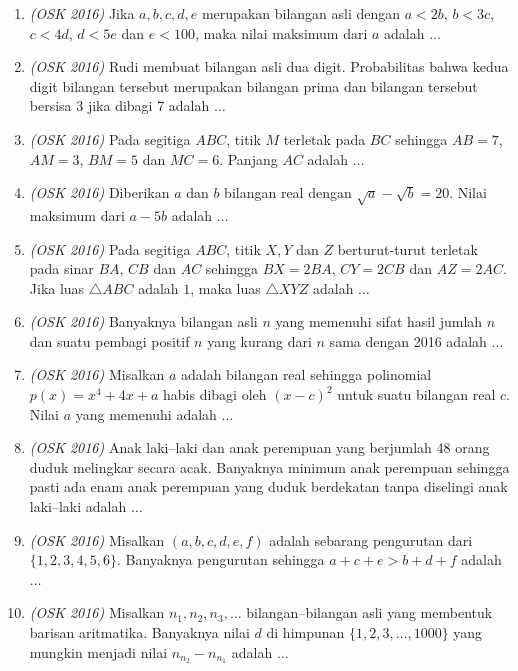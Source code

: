 \begin{enumerate}
	\item \textit{(OSK 2016)} Jika $a,b,c,d,e$ merupakan bilangan asli dengan $a < 2b$, $b < 3c$, $c < 4d$, $d < 5e$ dan $e < 100$, maka nilai maksimum dari $a$ adalah $\dots$
	
	\item \textit{(OSK 2016)} Rudi membuat bilangan asli dua digit. Probabilitas bahwa kedua digit bilangan tersebut merupakan bilangan prima dan bilangan tersebut bersisa 3 jika dibagi 7 adalah $\dots$
	
	\item \textit{(OSK 2016)} Pada segitiga $ABC$, titik $M$ terletak pada $BC$ sehingga $AB = 7$, $AM = 3$, $BM = 5$ dan $MC = 6$. Panjang $AC$ adalah $\dots$
	
	\item \textit{(OSK 2016)} Diberikan $a$ dan $b$ bilangan real dengan $\sqrt{a} - \sqrt{b} = 20$. Nilai maksimum dari $a - 5b$ adalah $\dots$
	
	\item \textit{(OSK 2016)} Pada segitiga $ABC$, titik $X,Y$ dan $Z$ berturut-turut terletak pada sinar $BA$, $CB$ dan $AC$ sehingga $BX = 2BA$, $CY = 2CB$ dan $AZ = 2AC$. Jika luas $\triangle ABC$ adalah $1$, maka luas $\triangle XYZ$ adalah $\dots$
	
	\item \textit{(OSK 2016)} Banyaknya bilangan asli $n$ yang memenuhi sifat hasil jumlah $n$ dan suatu pembagi positif $n$ yang kurang dari $n$ sama dengan 2016 adalah $\dots$
	
	\item \textit{(OSK 2016)} Misalkan $a$ adalah bilangan real sehingga polinomial $p(x) = x^4 + 4x + a$ habis dibagi oleh $(x - c)^2$ untuk suatu bilangan real $c$. Nilai $a$ yang memenuhi adalah $\dots$
	
	\item \textit{(OSK 2016)} Anak laki–laki dan anak perempuan yang berjumlah 48 orang duduk melingkar secara acak. Banyaknya minimum anak perempuan sehingga pasti ada enam anak perempuan yang duduk berdekatan tanpa diselingi anak laki–laki adalah $\dots$
	
	\item \textit{(OSK 2016)} Misalkan $(a,b,c,d,e,f)$ adalah sebarang pengurutan dari $\{1,2,3,4,5,6\}$. Banyaknya pengurutan sehingga $a + c + e > b + d + f$ adalah $\dots$
	
	\item \textit{(OSK 2016)} Misalkan $n_1, n_2, n_3, \dots$ bilangan–bilangan asli yang membentuk barisan aritmatika. Banyaknya nilai $d$ di himpunan $\{1,2,3,\dots,1000\}$ yang mungkin menjadi nilai $n_{n_2} - n_{n_1}$ adalah $\dots$
	

\end{enumerate}
